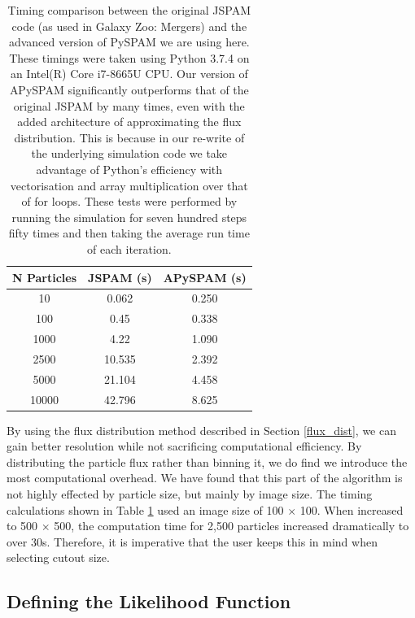 \begin{table}
    \centering
    \begin{tabular}{|c|c|c|}
    \hline
        N Particles & JSPAM (s) & APySPAM (s)  \\
        \hline
        10 & 0.062 & 0.250 \\
        100 & 0.45 &  0.338 \\
        1000 & 4.22 & 1.090 \\
        2500 & 10.535 & 2.392 \\
        5000 & 21.104 & 4.458 \\
        10000 & 42.796 & 8.625 \\
        \hline
    \end{tabular}
    \caption{Timing comparison between the original JSPAM code (as used in Galaxy Zoo: Mergers) and the advanced version of PySPAM we are using here. These timings were taken using Python 3.7.4 on an Intel(R) Core i7-8665U CPU. Our version of APySPAM significantly outperforms that of the original JSPAM by many times, even with the added architecture of approximating the flux distribution. This is because in our re-write of the underlying simulation code we take advantage of Python's efficiency with vectorisation and array multiplication over that of for loops. These tests were performed by running the simulation for seven hundred steps fifty times and then taking the average run time of each iteration.}
    \label{tab:timings}
\end{table}

By using the flux distribution method described in Section \ref{flux_dist}, we can gain better resolution while not sacrificing computational efficiency. By distributing the particle flux rather than binning it, we do find we introduce the most computational overhead. We have found that this part of the algorithm is not highly effected by particle size, but mainly by image size. The timing calculations shown in Table \ref{tab:timings} used an image size of 100 $\times$ 100. When increased to 500 $\times$ 500, the computation time for 2,500 particles increased dramatically to over 30s. Therefore, it is imperative that the user keeps this in mind when selecting cutout size.

\subsection{Defining the Likelihood Function}
